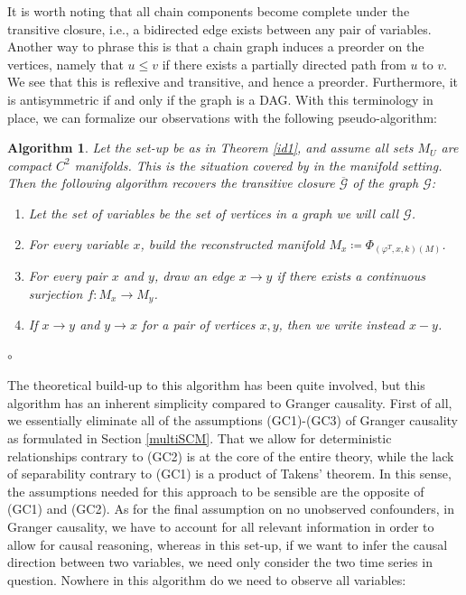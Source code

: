 \documentclass[11pt, a4paper]{memoir}
\theoremstyle{break}
\theoremstyle{break}
\newtheorem{inneralg}{Algorithm}
\newenvironment{alg}{\begin{inneralg}}{\ensuremath{\circ}\end{inneralg}}
\theoremstyle{nonumberplain}
\begin{document}
 It is worth noting that all chain components become complete under the transitive closure, i.e., a bidirected edge exists between any pair of variables. Another way to phrase this is that a chain graph induces a preorder on the vertices, namely that $u\leqslant v$ if there exists a partially directed path from $u$ to $v$. We see that this is reflexive and transitive, and hence a preorder. Furthermore, it is antisymmetric if and only if the graph is a DAG. With this terminology in place, we can formalize our observations with the following pseudo-algorithm:
\begin{alg}\label{trans}
Let the set-up be as in Theorem \ref{id1}, and assume all sets $M_U$ are compact $C^2$ manifolds. This is the situation covered by \cite{mathFound} in the manifold setting. Then the following algorithm recovers the transitive closure $\overline{\mathcal{G}}$ of the graph $\mathcal{G}$:
\begin{enumerate}[label=(\roman*)]
	\item Let the set of variables be the set of vertices in a graph we will call $\mathcal{G}$.
	\item For every variable $x$, build the reconstructed manifold $M_x\coloneqq \Phi	_{(\varphi^T,x,k)(M)}$.
	\item For every pair $x$ and $y$, draw an edge $x\to y$ if there exists a continuous surjection $f:M_x\to M_y$.
	\item If $x\to y$ and $y\to x$ for a pair of vertices $x,y$, then we write instead $x-y$.
\end{enumerate}
\end{alg}
The theoretical build-up to this algorithm has been quite involved, but this algorithm has an inherent simplicity compared to Granger causality. First of all, we essentially eliminate all of the assumptions (GC1)-(GC3) of Granger causality as formulated in Section \ref{multiSCM}. That we allow for deterministic relationships contrary to (GC2) is at the core of the entire theory, while the lack of separability contrary to (GC1) is a product of Takens' theorem. In this sense, the assumptions needed for this approach to be sensible are the opposite of (GC1) and (GC2). As for the final assumption on no unobserved confounders, in Granger causality, we have to account for all relevant information in order to allow for causal reasoning, whereas in this set-up, if we want to infer the causal direction between two variables, we need only consider the two time series in question. Nowhere in this algorithm do we need to observe all variables:\\[5pt]
\end{document}
